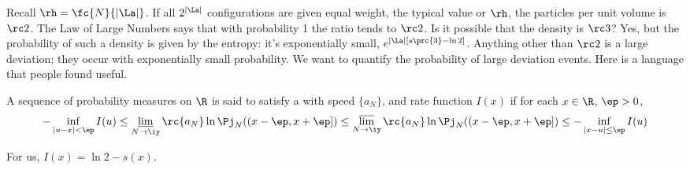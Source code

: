 Recall $\rh=\fc{N}{|\La|}$. %
If all $2^{|\La|}$ configurations are given equal weight, the typical value or $\rh$, the particles per unit volume is $\rc2$. The Law of Large Numbers says that with probability 1 the ratio tends to $\rc2$. Is it possible that the density is $\rc3$? Yes, but the probability of such a density is given by the entropy: it's exponentially small, $e^{|\La|[s\prc{3} -\ln 2]}$. Anything other than $\rc2$ is a large deviation; they occur with exponentially small probability. We want to quantify the probability of large deviation events. Here is a language that people found useful.
\begin{df}
A sequence of probability measures on $\R$ is said to satisfy a  with speed $\{a_N\}$, and rate function $I(x)$ if for each $x\in \R$, $\ep>0$,
\[
-\inf_{|u-x|<\ep} I(u)\le 
\varliminf_{N\to \iy}\rc{a_N} \ln \Pj_N((x-\ep,x+\ep]) \le \varlimsup_{N\to \iy} \rc{a_N} \ln \Pj_N((x-\ep,x+\ep]) \le 
-\inf_{|x-u|\le \ep} I(u)
\]
\end{df}
For us, $I(x)=\ln 2 - s(x)$.

